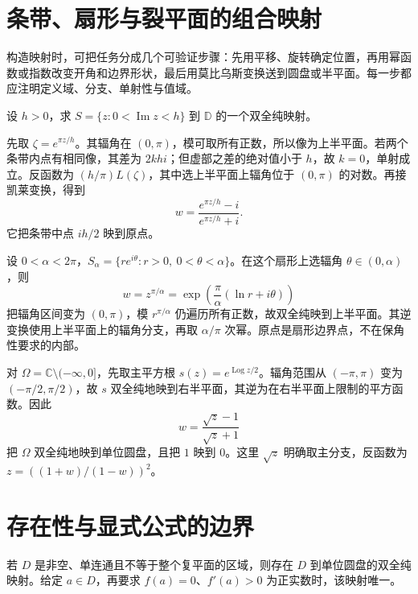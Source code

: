 \documentclass[UTF8,12pt,a4paper,fontset=fandol]{ctexbook}
\begin{document}
\section{条带、扇形与裂平面的组合映射}

构造映射时，可把任务分成几个可验证步骤：先用平移、旋转确定位置，再用幂函数或指数改变开角和边界形状，最后用莫比乌斯变换送到圆盘或半平面。每一步都应注明定义域、分支、单射性与值域。

\begin{example}[水平条带映到单位圆盘]
设 $h>0$，求 $S=\{z:0<\operatorname{Im}z<h\}$ 到 $\mathbb D$ 的一个双全纯映射。
\end{example}
\begin{solve}
先取 $\zeta=e^{\pi z/h}$。其辐角在 $(0,\pi)$，模可取所有正数，所以像为上半平面。若两个条带内点有相同像，其差为 $2khi$；但虚部之差的绝对值小于 $h$，故 $k=0$，单射成立。反函数为 $(h/\pi)L(\zeta)$，其中选上半平面上辐角位于 $(0,\pi)$ 的对数。再接凯莱变换，得到
\[
 w=\frac{e^{\pi z/h}-i}{e^{\pi z/h}+i}.
\]
它把条带中点 $ih/2$ 映到原点。
\end{solve}

\begin{example}[扇形映到上半平面]
设 $0<\alpha<2\pi$，$S_\alpha=\{re^{i\theta}:r>0,\ 0<\theta<\alpha\}$。在这个扇形上选辐角 $\theta\in(0,\alpha)$，则
\[
 w=z^{\pi/\alpha}=\exp\left(\frac\pi\alpha(\ln r+i\theta)\right)
\]
把辐角区间变为 $(0,\pi)$，模 $r^{\pi/\alpha}$ 仍遍历所有正数，故双全纯映到上半平面。其逆变换使用上半平面上的辐角分支，再取 $\alpha/\pi$ 次幂。原点是扇形边界点，不在保角性要求的内部。
\end{example}

\begin{example}[裂平面映到圆盘]
对 $\Omega=\mathbb C\setminus(-\infty,0]$，先取主平方根 $s(z)=e^{\operatorname{Log}z/2}$。辐角范围从 $(-\pi,\pi)$ 变为 $(-\pi/2,\pi/2)$，故 $s$ 双全纯地映到右半平面，其逆为在右半平面上限制的平方函数。因此
\[
 w=\frac{\sqrt z-1}{\sqrt z+1}
\]
把 $\Omega$ 双全纯地映到单位圆盘，且把 $1$ 映到 $0$。这里 $\sqrt z$ 明确取主分支，反函数为 $z=((1+w)/(1-w))^2$。
\end{example}

\section{存在性与显式公式的边界}

\begin{theorem}[黎曼映射定理，选读]
若 $D$ 是非空、单连通且不等于整个复平面的区域，则存在 $D$ 到单位圆盘的双全纯映射。给定 $a\in D$，再要求 $f(a)=0$、$f'(a)>0$ 为正实数时，该映射唯一。
\end{theorem}
\end{document}
